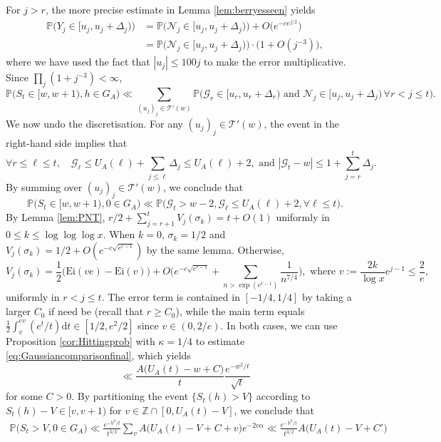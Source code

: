 \documentclass{amsart}
\theoremstyle{definition}
\theoremstyle{remark}
\numberwithin{equation}{section}
\begin{document}
 For $j>r$, the more precise estimate in Lemma \ref{lem:berryesseen} yields
\begin{align*}
    \mathbb{P}\big(Y_j\in [u_j,u_j+\Delta_j)\big)&=\mathbb{P}\big(\mathcal{N}_j\in [u_j,u_j+\Delta_j)\big)+O\big(e^{-ce^{j/2}}\big)\\
    &=\mathbb{P}\big(\mathcal{N}_j\in [u_j,u_j+\Delta_j)\big)\cdot\big(1+O(j^{-3})\big),
\end{align*}
where we have used the fact that $|u_j|\leq 100j$ to make the error multiplicative. Since $\prod_{j}(1+j^{-3})<\infty$, 
\begin{equation*}
    \mathbb{P}\big(S_{t}\in [w,w+1), h\in G_A \big) \ll \sum_{(u_j)_j\in \mathcal{T}'(w)}\mathbb{P}\big(\mathcal{G}_r\in [u_r,u_r+\Delta_r)\text{ and }\mathcal{N}_j\in[u_j,u_j+\Delta_j)\,\forall r<j\leq t\big).
\end{equation*}
We now undo the discretisation. For any $(u_j)_j\in \mathcal{T}'(w)$, the event in the right-hand side implies that
\[
    \forall r\leq \ell\leq t,\quad \mathcal{G}_\ell \leq U_A(\ell)+\sum_{j\leq \ell} \Delta_j\leq U_A(\ell)+2, \text{ and } |\mathcal{G}_{t}-w|\leq 1+\sum_{j=r}^t \Delta_j.
\]
By summing over $(u_j)_{j}\in\mathcal{T}'(w)$, we conclude that
\begin{equation}\label{eq:Gaussiancomparisonfinal}
    \mathbb{P}\big(S_{t}\in [w,w+1), 0\in G_A \big)\ll \mathbb{P}\big(\mathcal{G}_{t}>w-2, \mathcal{G}_{\ell}\leq U_A(\ell)+2,\forall  \ell\leq t\big).
\end{equation}
By Lemma \ref{lem:PNT}, $r/2+\sum_{j=r+1}^tV_j(\sigma_k)=t+O(1)$ uniformly in $0\leq k\leq \log\log\log x$. When $k=0$, $\sigma_k=1/2$ and $V_j(\sigma_k)={1}/{2}+O(e^{-c\sqrt{e^{r-1}}})$ by the same lemma. Otherwise,
\[
    V_j(\sigma_k)=\frac{1}{2}\Big(\mathrm{Ei}(ve)-\mathrm{Ei}(v)\Big)+O\Big(e^{-c\sqrt{e^{r-1}}}+\sum_{n>\exp(e^{r-1})}\frac{1}{n^{7/4}}\Big),\text{ where } v:=\frac{2k}{\log x}e^{j-1}\leq \frac{2}{e},
\]
uniformly in $r<j\leq t$.
The error term is contained in $[-1/4,1/4]$ by taking a larger $C_0$ if need be (recall that $r\geq C_0$), while the main term equals $\frac{1}{2}\int_{v}^{ev} (e^t/t) \mathrm{d}t\in [1/2,e^2/2]$ since $v\in (0,2/e)$. In both cases, we can use Proposition \ref{cor:Hittingprob} with $\kappa=1/4$ to estimate \eqref{eq:Gaussiancomparisonfinal}, which yields 
\[
    \ll \frac{A\big(U_A(t)-w+C\big)}{t}\frac{e^{-w^2/t}}{\sqrt{t}}
\]
for some $C>0$.
By partitioning the event $\{S_{t}(h)>V\}$ according to $S_{t}(h)-V\in [v,v+1)$ for $v\in \mathbb{Z}\cap [0,U_A(t)-V]$, we conclude that
\begin{align*}
    \mathbb{P}\big(S_{t}>V, 0\in G_A \big)\ll \frac{e^{-V^2/t}}{t^{3/2}}\sum_{v} {A\big(U_A(t)-V+C+v\big)}e^{-2v\alpha} \ll \frac{e^{-V^2/t}}{t^{3/2}}{A\big(U_A(t)-V+C'\big)}
\end{align*}
\end{document}
